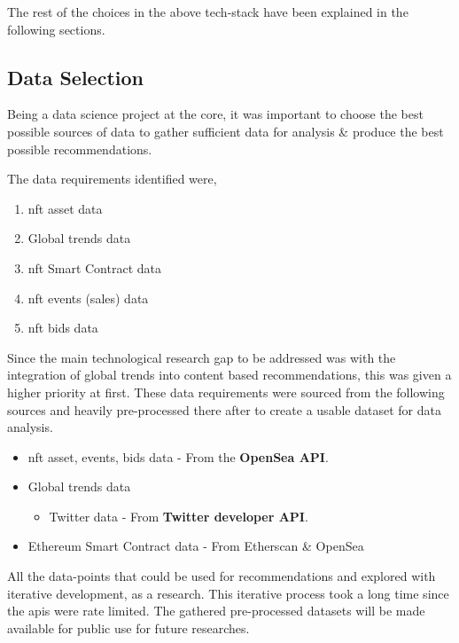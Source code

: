 \noindent The rest of the choices in the above tech-stack have been explained in the following sections.

\subsection{Data Selection}
Being a data science project at the core, it was important to choose the best possible sources of data to gather sufficient data for analysis \& produce the best possible recommendations.

The data requirements identified were,
\begin{enumerate}
\item \gls{nft} asset data
\item Global trends data
\item \gls{nft} Smart Contract data
\item \gls{nft} events (sales) data
\item \gls{nft} bids data
\end{enumerate}

Since the main technological research gap to be addressed was with the integration of global trends into content based recommendations, this was given a higher priority at first.
These data requirements were sourced from the following sources and heavily pre-processed there after to create a usable dataset for data analysis. 

\begin{itemize}
\item \gls{nft} asset, events, bids data - From the \textbf{OpenSea API}.
\item Global trends data
\begin{itemize}
    \item Twitter data - From \textbf{Twitter developer API}.
\end{itemize}
\item Ethereum Smart Contract data - From Etherscan \& OpenSea
\end{itemize}


All the data-points that could be used for recommendations and explored with iterative development, as a research. This iterative process took a long time since the \gls{api}s were rate limited. The gathered pre-processed datasets will be made available for public use for future researches.

